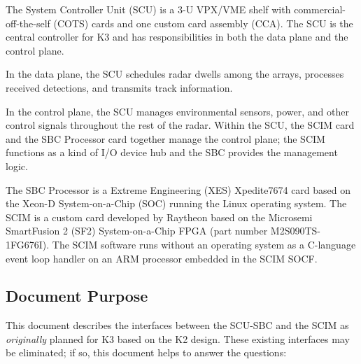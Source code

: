 \documentclass[12pt]{article}
\begin{document}
The System Controller Unit (SCU) is a 3-U VPX/VME shelf with commercial-off-the-self (COTS)
cards and one custom card assembly (CCA).  The SCU is the central controller for K3 and
has responsibilities in both the data plane and the control plane.


In the data plane, the SCU schedules radar dwells among the arrays,
processes received detections, and transmits track information.

In the control plane, the SCU manages environmental sensors, power,
and other control signals throughout the rest of the radar.  Within the SCU,
the SCIM card and the SBC Processor card together manage the control plane; the
SCIM functions as a kind of I/O device hub and the SBC provides the management logic.

The SBC Processor is a Extreme Engineering (XES) Xpedite7674 card based on the Xeon-D
System-on-a-Chip (SOC) running the Linux operating system.  The SCIM is a custom card
developed by Raytheon based on the Microsemi SmartFusion 2 (SF2) System-on-a-Chip FPGA
(part number M2S090TS-1FG676I).  The SCIM software runs without an operating system as
a C-language event loop handler on an ARM processor embedded in the SCIM SOCF.


\subsection{Document Purpose}
This document describes the interfaces between the
SCU-SBC and the SCIM as \emph{originally} planned for K3 based on the K2 design.
These existing interfaces may be eliminated; if so, this document helps to answer
the questions:
\vspace{0.4cm}
\end{document}
